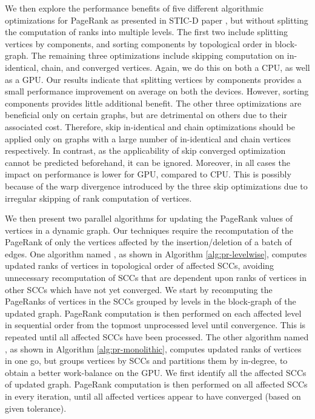 We then explore the performance benefits of five different algorithmic optimizations for PageRank as presented in STIC-D paper \cite{pr-sticd16}, but without splitting the computation of ranks into multiple levels. The first two include splitting vertices by components, and sorting components by topological order in block-graph. The remaining three optimizations include skipping computation on in-identical, chain, and converged vertices. Again, we do this on both a CPU, as well as a GPU.
Our results indicate that splitting vertices by components provides a small performance improvement on average on both the devices. However, sorting components provides little additional benefit. The other three optimizations are beneficial only on certain graphs, but are detrimental on others due to their associated cost. Therefore, skip in-identical and chain optimizations should be applied only on graphs with a large number of in-identical and chain vertices respectively. In contrast, as the applicability of skip converged optimization cannot be predicted beforehand, it can be ignored. Moreover, in all cases the impact on performance is lower for GPU, compared to CPU. This is possibly because of the warp divergence introduced by the three skip optimizations due to irregular skipping of rank computation of vertices.

% 
% 


We then present two parallel algorithms for updating the PageRank values of vertices in a dynamic graph. Our techniques require the recomputation of the PageRank of only the vertices affected by the insertion/deletion of a batch of edges. One algorithm named \levelwisePR{}, as shown in Algorithm \ref{alg:pr-levelwise}, computes updated ranks of vertices in topological order of affected SCCs, avoiding unnecessary recomputation of SCCs that are dependent upon ranks of vertices in other SCCs which have not yet converged. We start by recomputing the PageRanks of vertices in the SCCs grouped by levels in the block-graph of the updated graph. PageRank computation is then performed on each affected level in sequential order from the topmost unprocessed level until convergence. This is repeated until all affected SCCs have been processed. The other algorithm named \monolithicPR{}, as shown in Algorithm \ref{alg:pr-monolithic}, computes updated ranks of vertices in one go, but groups vertices by SCCs and partitions them by in-degree, to obtain a better work-balance on the GPU. We first identify all the affected SCCs of updated graph. PageRank computation is then performed on all affected SCCs in every iteration, until all affected vertices appear to have converged (based on given tolerance).

